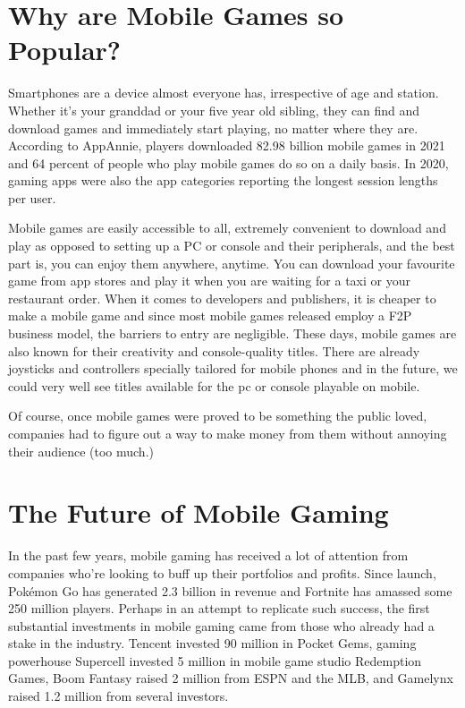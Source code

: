 \documentclass[sig-alternate]{article}
\begin{document}
\begin{multicols}{1}
\section{Why are Mobile Games so Popular?}
Smartphones are a device almost everyone has, irrespective of age and station. Whether it’s your granddad or your five year old sibling, they can find and download games and immediately start playing, no matter where they are. According to AppAnnie, players downloaded 82.98 billion mobile games in 2021 and 64 percent of people who play mobile games do so on a daily basis. In 2020, gaming apps were also the app categories reporting the longest session lengths per user. 

Mobile games are easily accessible to all, extremely convenient to download and play as opposed to setting up a PC or console and their peripherals, and the best part is, you can enjoy them anywhere, anytime. You can download your favourite game from app stores and play it when you are waiting for a taxi or your restaurant order. When it comes to developers and publishers, it is cheaper to make a mobile game and since most mobile games released employ a F2P business model, the barriers to entry are negligible. These days, mobile games are also known for their creativity and console-quality titles. There are already joysticks and controllers specially tailored for mobile phones and in the future, we could very well see titles available for the pc or console playable on mobile.

Of course, once mobile games were proved to be something the public loved, companies had to figure out a way to make money from them without annoying their audience (too much.)

\section{The Future of Mobile Gaming}
In the past few years, mobile gaming has received a lot of attention from companies who’re looking to buff up their portfolios and profits. Since launch, Pokémon Go has generated 2.3 billion in revenue and Fortnite has amassed some 250 million players. Perhaps in an attempt to replicate such success, the first substantial investments in mobile gaming came from those who already had a stake in the industry. Tencent invested 90 million in Pocket Gems, gaming powerhouse Supercell invested 5 million in mobile game studio Redemption Games, Boom Fantasy raised 2 million from ESPN and the MLB, and Gamelynx raised 1.2 million from several investors. 


\end{multicols}
\end{document}
